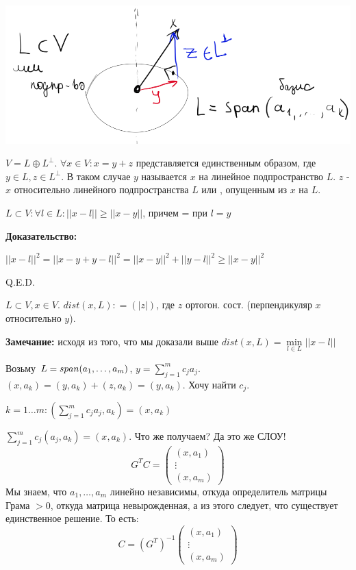 \begin{center}
   \includegraphics[width = 10 cm]{assets/9_4-orthogonal-projection.png}
\end{center}

$V = L \oplus L^\perp$. $\forall x \in V: x = y + z$ представляется единственным образом, где $y\in L, z\in L^\perp$. В таком случае $y$ называется  $x$ на линейное подпространство $L$. $z$ -  $x$ относительно линейного подпространства $L$ или , опущенным из $x$ на $L$.


$L \subset V: \forall  l \in L: ||x-l|| \geq ||x-y||$, причем = при $l=y$

\textbf{Доказательство:}

$||x-l||^2 = ||x-y +y - l||^2 = ||x-y||^2 + ||y-l||^2 \geq ||x-y||^2$

\hfill Q.E.D.

 $L \subset V, x\in V$. $dist(x,L) : = (|z|)$, где $z$ ортогон. сост. (перпендикуляр $x$ относительно $y$).

\textbf{Замечание:} исходя из того, что мы доказали выше $dist(x,L) =\min\limits_{l\in L} ||x-l||$


Возьму $L = span(a_1,\ldots, a_m)$, $y= \sum\limits_{j=1}^{m}c_ja_j$. $(x,a_k) = (y,a_k) + (z,a_k)= (y,a_k)$. Хочу найти $c_j$.

$k = 1\ldots m: \left(\sum\limits_{j=1}^m c_j a_j, a_k\right) = (x,a_k)$

$\sum\limits_{j=1}^m c_j (a_j, a_k) =(x,a_k)$. Что же получаем? Да это же СЛОУ!
$$G^TC = \begin{pmatrix}
    (x,a_1)\\
    \vdots \\
    (x,a_m)
\end{pmatrix}$$
Мы знаем, что $a_1,\ldots , a_m$ линейно независимы, откуда определитель матрицы Грама $>0$, откуда матрица невырожденная, а из этого следует, что существует единственное решение. То есть:
$$C = (G^T)^{-1}\begin{pmatrix}
    (x,a_1)\\
    \vdots \\
    (x,a_m)
\end{pmatrix}$$

